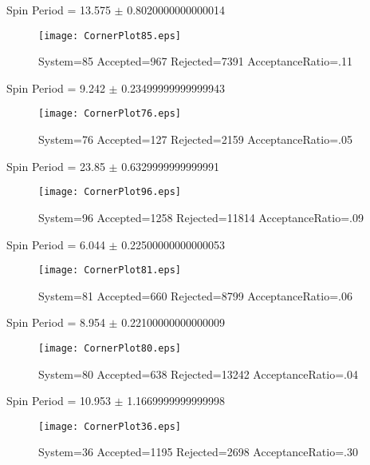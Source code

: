 \documentclass[10pt]{article}
\begin{document}
\listoffigures
\newpage
\begin{center}
        Spin Period = 13.575 $\pm$ 0.8020000000000014
        \end{center}
\begin{figure}[H] 
        \texttt{[image: CornerPlot85.eps]}
        \caption{System=85 Accepted=967 Rejected=7391 AcceptanceRatio=.11}
        \label{S85}
        \centering
        \end{figure}
\newpage
\begin{center}
        Spin Period = 9.242 $\pm$ 0.23499999999999943
        \end{center}
\begin{figure}[H] 
        \texttt{[image: CornerPlot76.eps]}
        \caption{System=76 Accepted=127 Rejected=2159 AcceptanceRatio=.05}
        \label{S76}
        \centering
        \end{figure}
\newpage
\begin{center}
        Spin Period = 23.85 $\pm$ 0.6329999999999991
        \end{center}
\begin{figure}[H] 
        \texttt{[image: CornerPlot96.eps]}
        \caption{System=96 Accepted=1258 Rejected=11814 AcceptanceRatio=.09}
        \label{S96}
        \centering
        \end{figure}
\newpage
\begin{center}
        Spin Period = 6.044 $\pm$ 0.22500000000000053
        \end{center}
\begin{figure}[H] 
        \texttt{[image: CornerPlot81.eps]}
        \caption{System=81 Accepted=660 Rejected=8799 AcceptanceRatio=.06}
        \label{S81}
        \centering
        \end{figure}
\newpage
\begin{center}
        Spin Period = 8.954 $\pm$ 0.22100000000000009
        \end{center}
\begin{figure}[H] 
        \texttt{[image: CornerPlot80.eps]}
        \caption{System=80 Accepted=638 Rejected=13242 AcceptanceRatio=.04}
        \label{S80}
        \centering
        \end{figure}
\newpage
\begin{center}
        Spin Period = 10.953 $\pm$ 1.1669999999999998
        \end{center}
\begin{figure}[H] 
        \texttt{[image: CornerPlot36.eps]}
        \caption{System=36 Accepted=1195 Rejected=2698 AcceptanceRatio=.30}
        \label{S36}
        \centering
        \end{figure}
\end{document}
